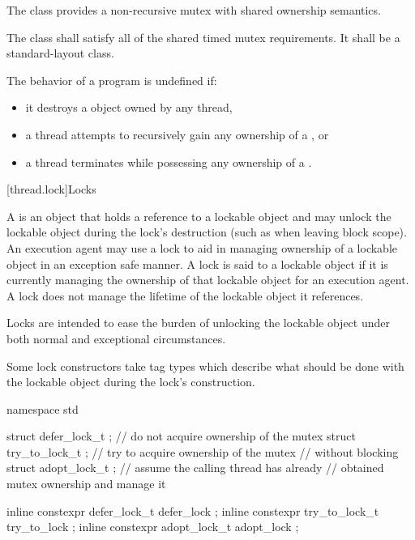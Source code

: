 \pnum
The class  provides a non-recursive mutex with shared
ownership semantics.

\pnum
The class  shall satisfy all of the
shared timed mutex requirements.
It shall be a standard-layout class.

\pnum
The behavior of a program is undefined if:
\begin{itemize}
\item it destroys a  object owned by any thread,
\item a thread attempts to recursively gain any ownership of a , or
\item a thread terminates while possessing any ownership of a .
\end{itemize}

[thread.lock]{Locks}

\pnum
A  is an object that holds a reference to a lockable object and may unlock the
lockable object during the lock's destruction (such as when leaving block scope). An execution
agent may use a lock to aid in managing ownership of a lockable object in an exception safe
manner. A lock is said to  a lockable object if it is currently managing the
ownership of that lockable object for an execution agent. A lock does not manage the lifetime
of the lockable object it references. \begin{note} Locks are intended to ease the burden of
unlocking the lockable object under both normal and exceptional circumstances. \end{note}

\pnum
Some lock constructors take tag types which describe what should be done with the lockable
object during the lock's construction.

%
%
%
%
%
%
\begin{codeblock}
namespace std {
  struct defer_lock_t  { };     // do not acquire ownership of the mutex
  struct try_to_lock_t { };     // try to acquire ownership of the mutex
                                // without blocking
  struct adopt_lock_t  { };     // assume the calling thread has already
                                // obtained mutex ownership and manage it

  inline constexpr defer_lock_t   defer_lock { };
  inline constexpr try_to_lock_t  try_to_lock { };
  inline constexpr adopt_lock_t   adopt_lock { };
}
\end{codeblock}

